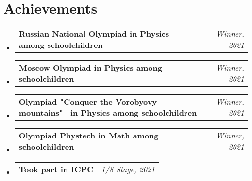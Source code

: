 \documentclass[a4paper,11pt]{article}
\makeatletter
\newcommand{\resumePOR}[3]{
\vspace{0.5mm}\item
    \begin{tabular*}{0.97\textwidth}[t]{l@{\extracolsep{\fill}}r}
        \textbf{#1}\hspace{0.3mm}#2 & \textit{\small{#3}} 
    \end{tabular*}
    \vspace{-2mm}
}
\newcommand{\resumeSubHeadingListStart}{\begin{itemize}[leftmargin=*,labelsep=0mm]}
\newcommand{\resumeSubHeadingListEnd}{\end{itemize}\vspace{2mm}}
\makeatother
\begin{document}
    




\section{\textbf{Achievements}}
\vspace{-0.4mm}
\resumeSubHeadingListStart
\resumePOR{Russian National Olympiad in Physics among schoolchildren} %
    {} %
    {Winner, 2021} %
    
\resumePOR{Moscow Olympiad in Physics among schoolchildren} %
    {} %
    {Winner, 2021} %
    
\resumePOR{Olympiad "Conquer the Vorobyovy mountains" \ in Physics among schoolchildren} %
    {} %
    {Winner, 2021} %
    
\resumePOR{Olympiad Phystech in Math among schoolchildren} %
    {} %
    {Winner, 2021} %

\resumePOR{Took part in ICPC} %
    {} %
    {1/8 Stage, 2021} %

\resumeSubHeadingListEnd
\vspace{-5mm}



\end{document}
